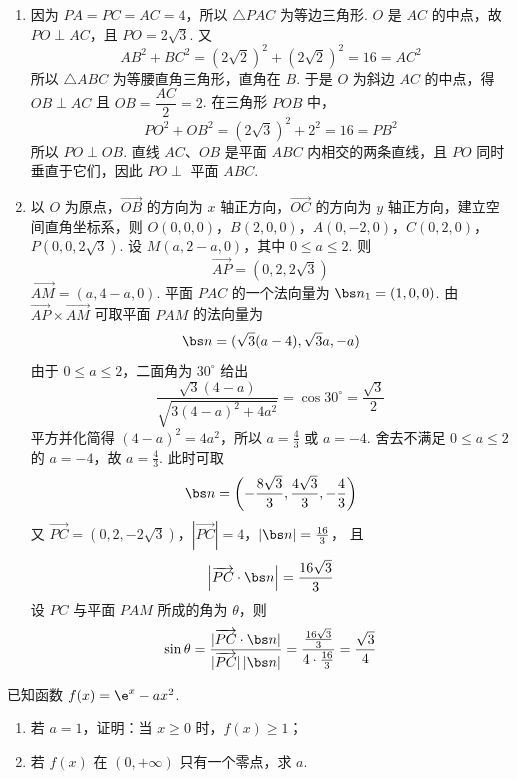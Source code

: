 \begin{solution}
\begin{enumerate}
\item 因为 \(PA=PC=AC=4\)，所以 \(\triangle PAC\) 为等边三角形. \(O\) 是 \(AC\) 的中点，故
\(PO\perp AC\)，且
\(PO=2\sqrt3\). 又
\[
AB^2+BC^2=(2\sqrt2)^2+(2\sqrt2)^2=16=AC^2
\]
所以 \(\triangle ABC\) 为等腰直角三角形，直角在 \(B\). 于是 \(O\) 为斜边 \(AC\) 的中点，得
\(OB\perp AC\) 且 \(OB=\dfrac{AC}{2}=2\). 在三角形 \(POB\) 中，
\[
PO^2+OB^2=(2\sqrt3)^2+2^2=16=PB^2
\]
所以 \(PO\perp OB\). 直线 \(AC\)、\(OB\) 是平面 \(ABC\) 内相交的两条直线，且 \(PO\) 同时垂直于它们，因此
\(PO\perp\) 平面 \(ABC\).
\item 以 \(O\) 为原点，\(\overrightarrow{OB}\) 的方向为 \(x\) 轴正方向，\(\overrightarrow{OC}\) 的方向为 \(y\) 轴正方向，建立空间直角坐标系，则
\(O(0,0,0)\)，\(B(2,0,0)\)，\(A(0,-2,0)\)，\(C(0,2,0)\)，\(P(0,0,2\sqrt3)\).
设 \(M(a,2-a,0)\)，其中 \(0\le a\le2\). 则
\[
\overrightarrow{AP}=(0,2,2\sqrt3)
\]
\(\overrightarrow{AM}=(a,4-a,0)\).
平面 \(PAC\) 的一个法向量为 \(\bs n_1=(1,0,0)\). 由
\(\overrightarrow{AP}\times\overrightarrow{AM}\) 可取平面 \(PAM\) 的法向量为
\[
\bs n=(\sqrt3(a-4),\sqrt3a,-a)
\]
由于 \(0\le a\le2\)，二面角为 \(30^\circ\) 给出
\[
\frac{\sqrt3(4-a)}{\sqrt{3(4-a)^2+4a^2}}=\cos30^\circ=\frac{\sqrt3}{2}
\]
平方并化简得
\((4-a)^2=4a^2\)，所以 \(a=\frac{4}{3}\) 或 \(a=-4\). 舍去不满足 \(0\le a\le2\) 的 \(a=-4\)，故 \(a=\frac{4}{3}\). 此时可取
\[
\bs n=\left(-\frac{8\sqrt3}{3},\frac{4\sqrt3}{3},-\frac43\right)
\]
又
\(\overrightarrow{PC}=(0,2,-2\sqrt3)\)，\(|\overrightarrow{PC}|=4\)，\(|\bs n|=\frac{16}{3}\)，
且
\[
\left|\overrightarrow{PC}\cdot\bs n\right|
=\frac{16\sqrt3}{3}
\]
设 \(PC\) 与平面 \(PAM\) 所成的角为 \(\theta\)，则
\[
\sin\theta=\frac{|\overrightarrow{PC}\cdot\bs n|}{|\overrightarrow{PC}|\,|\bs n|}
=\frac{\frac{16\sqrt3}{3}}{4\cdot\frac{16}{3}}
=\frac{\sqrt3}{4}
\]
\end{enumerate}
\end{solution}

\begin{problem}
已知函数 \(f(x)=\e^x-ax^2\).

\begin{enumerate}
\item 若 \(a=1\)，证明：当 \(x\ge0\) 时，\(f(x)\ge1\)；
\item 若 \(f(x)\) 在 \((0,+\infty)\) 只有一个零点，求 \(a\).
\end{enumerate}
\end{problem}

